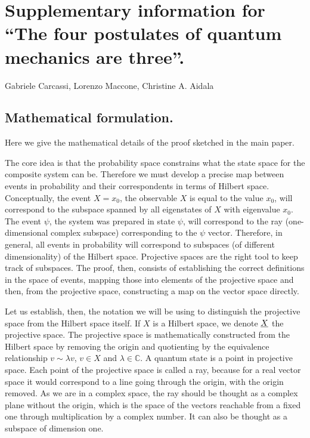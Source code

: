 \documentclass[aps,prl,amsmath,amssymb,twocolumn,nofootinbib]{revtex4}
\theoremstyle{plain}
\theoremstyle{definition}
\theoremstyle{remark}
\newcommand{\pj}[1] {\underbar{$#1$}}
\begin{document}
	
	
	\section{Supplementary information for ``The four postulates of quantum
		mechanics are three''. }\label{app}
	\par\noindent 
	Gabriele Carcassi, Lorenzo Maccone, Christine A. Aidala
	\subsection{ Mathematical formulation.}
	\setcounter{section}{1}
	\setcounter{equation}{0}
	\renewcommand{\theequation}{S\arabic{equation}}
	
	Here we give the mathematical details of the proof sketched in the
	main paper.
	
	The core idea is that the probability space constrains what the state space for the composite system can be. Therefore we must develop a precise map between events in probability and their correspondents in terms of Hilbert space. Conceptually, the event $X = x_0$, the observable $X$ is equal to the value $x_0$, will correspond to the subspace spanned by all eigenstates of $X$ with eigenvalue $x_0$. The event $\psi$, the system was prepared in state $\psi$, will correspond to the ray (one-dimensional complex subspace) corresponding to the $\psi$ vector. Therefore, in general, all events in probability will correspond to subspaces (of different dimensionality) of the Hilbert space. Projective spaces are the right tool to keep track of subspaces. The proof, then, consists of establishing the correct definitions in the space of events, mapping those into elements of the projective space and then, from the projective space, constructing a map on the vector space directly.
	
	Let us establish, then, the notation we will be using to distinguish the projective space from
	the Hilbert space itself. If $X$ is a Hilbert space, we denote $\pj{X}$
	the projective space. The projective space is mathematically
	constructed from the Hilbert space by removing the origin and
	quotienting by the equivalence relationship $v \sim \lambda v$, $v\in
	X$ and $\lambda\in\mathbb{C}$. A quantum state is a point in
	projective space. Each point of the projective space is called a ray,
	because for a real vector space it would correspond to a line going through
	the origin, with the origin removed. As we are in a complex space, the
	ray should be thought as a complex plane without the origin, which is
	the space of the vectors reachable from a fixed one through
	multiplication by a complex number. It can also be thought as a
	subspace of dimension one.
	
\end{document}
